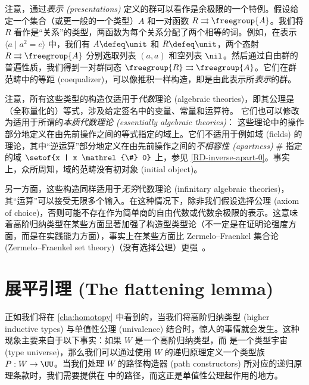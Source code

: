 %
注意，通过\emph{表示 (presentations)} 定义的群可以看作是余极限的一个特例。假设给定一个集合（或更一般的一个类型）$A$ 和一对函数 $R\rightrightarrows \freegroup{A}$。我们将 $R$ 看作是“关系”的类型，两函数为每个关系分配了两个相等的词。例如，在表示 $\langle a \mid a^2 = e \rangle$ 中，我们有 $A\defeq \unit$ 和 $R\defeq \unit$，两个态射 $R\rightrightarrows \freegroup{A}$ 分别选取列表 $(a,a)$ 和空列表 $\nil$。然后通过自由群的普遍性质，我们得到一对群同态 $\freegroup{R} \rightrightarrows \freegroup{A}$。它们在群范畴中的等距 (coequalizer)，可以像推积一样构造，即是由此表示所\emph{表示}的群。

\mentalpause

注意，所有这些类型的构造仅适用于\emph{代数}理论 (algebraic theories)，即其公理是（全称量化的）等式，涉及给定签名中的变量、常量和运算符。 它们也可以修改为适用于所谓的\emph{本质代数理论 (essentially algebraic theories)}： 这些理论中的操作部分地定义在由先前操作之间的等式指定的域上。它们不适用于例如域 (fields) 的理论，其中“逆运算”部分地定义在由先前操作之间的\emph{不相容性 (apartness)} $\#$ 指定的域 $\setof{x | x \mathrel{\#} 0}$ 上，参见 \cref{RD-inverse-apart-0}。事实上，众所周知，域的范畴没有初对象 (initial object)。%

另一方面，这些构造同样适用于\emph{无穷}代数理论 (infinitary algebraic theories)，其“运算”可以接受无限多个输入。在这种情况下，除非我们假设选择公理 (axiom of choice)，否则可能不存在作为简单商的自由代数或代数余极限的表示。这意味着高阶归纳类型在某些方面显著加强了构造型类型论（不一定是在证明论强度方面，而是在实践能力方面），事实上在某些方面比 Zermelo--Fraenkel 集合论 (Zermelo--Fraenkel set theory)（没有选择公理）更强~\cite{blass:freealg}。


\section{展平引理 (The flattening lemma)}
\label{sec:flattening}

正如我们将在 \cref{cha:homotopy} 中看到的，当我们将高阶归纳类型 (higher inductive types) 与单值性公理 (univalence) 结合时，惊人的事情就会发生。这种现象主要来自于以下事实：如果 $W$ 是一个高阶归纳类型，而 \UU 是一个类型宇宙 (type universe)，那么我们可以通过使用 $W$ 的递归原理定义一个类型族 $P:W\to \UU$。当我们处理 $W$ 的路径构造器 (path constructors) 所对应的递归原理条款时，我们需要提供在 \UU 中的路径，而这正是单值性公理起作用的地方。


